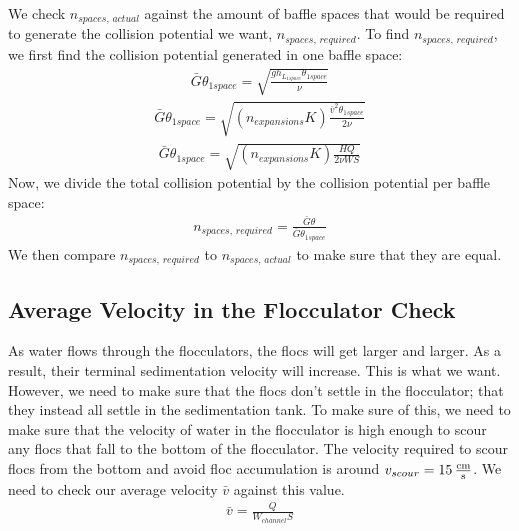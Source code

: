 \documentclass[letterpaper,10pt,english]{sphinxmanual}
\begin{document}
We check \(n_{spaces, \, actual}\) against the amount of baffle spaces that would be required to generate the collision potential we want, \(n_{spaces, \, required}\). To find \(n_{spaces, \, required}\), we first find the collision potential generated in one baffle space:
\begin{equation}\label{equation:Flocculation/Floc_Design:Flocculation/Floc_Design:36}
\begin{split}\bar G \theta_{1space} = \sqrt{ \frac{g h_{L_{1space}} \theta_{1space}}{\nu}}\end{split}
\end{equation}\begin{equation}\label{equation:Flocculation/Floc_Design:Flocculation/Floc_Design:37}
\begin{split}\bar G \theta_{1space} = \sqrt{ \left( n_{expansions} K \right) \frac{\bar v^2 \theta_{1space}}{2 \nu}}\end{split}
\end{equation}\begin{equation}\label{equation:Flocculation/Floc_Design:Flocculation/Floc_Design:38}
\begin{split}\bar G \theta_{1space} = \sqrt{ \left( n_{expansions} K \right) \frac{H Q}{2 \nu W S}}\end{split}
\end{equation}
Now, we divide the total collision potential by the collision potential per baffle space:
\begin{equation}\label{equation:Flocculation/Floc_Design:Flocculation/Floc_Design:39}
\begin{split}n_{spaces, \, required} = \frac{\bar G \theta}{\bar G \theta_{1space}}\end{split}
\end{equation}
We then compare \(n_{spaces, \, required}\) to \(n_{spaces, \, actual}\) to make sure that they are equal.


\subsection{Average Velocity in the Flocculator Check}
\label{\detokenize{Flocculation/Floc_Design:average-velocity-in-the-flocculator-check}}
As water flows through the flocculators, the flocs will get larger and larger. As a result, their terminal sedimentation velocity will increase. This is what we want. However, we need to make sure that the flocs don’t settle in the flocculator; that they instead all settle in the sedimentation tank. To make sure of this, we need to make sure that the velocity of water in the flocculator is high enough to scour any flocs that fall to the bottom of the flocculator. The velocity required to scour flocs from the bottom and avoid floc accumulation is around \(v_{scour} = 15 \, {\rm \frac{cm}{s}}\). We need to check our average velocity \(\bar v\) against this value.
\begin{equation}\label{equation:Flocculation/Floc_Design:Flocculation/Floc_Design:40}
\begin{split}\bar v = \frac{Q}{W_{channel} S}\end{split}
\end{equation}
\end{document}
